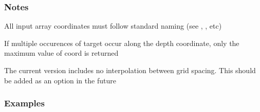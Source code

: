 \documentclass[letterpaper,10pt,english]{sphinxmanual}
\begin{document}
\begin{fulllineitems}
\begin{quote}
\begin{description}
\begin{description}
\end{description}

\end{description}\end{quote}
\subsubsection*{Notes}

\begin{DUlineblock}{0em}
\item[] All input array coordinates must follow standard naming (see ,                 , etc)
\item[] If multiple occurences of target occur along the depth coordinate, only the maximum value of                 coord is returned
\item[] The current version includes no interpolation between grid spacing. This should be added as                 an option in the future
\end{DUlineblock}
\subsubsection*{Examples}


\end{fulllineitems}
\end{document}
